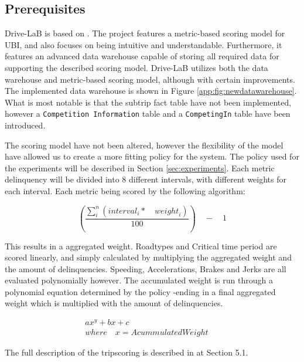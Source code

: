 \subsection{Prerequisites}\label{subsec:prereq}
Drive-LaB is based on \citep{sw9_report}. The project features a metric-based scoring model for UBI, and also focuses on being intuitive and understandable. Furthermore, it features an advanced data warehouse capable of storing all required data for supporting the described scoring model. Drive-LaB utilizes both the data warehouse and metric-based scoring model, although with certain improvements. The implemented data warehouse is shown in Figure \ref{app:fig:newdatawarehouse}. What is most notable is that the subtrip fact table have not been implemented, however a \texttt{Competition Information} table and a \texttt{CompetingIn} table have been introduced.

The scoring model have not been altered, however the flexibility of the model have allowed us to create a more fitting policy for the system. The policy used for the experiments will be described in Section \ref{sec:experiments}. Each metric delinquency will be divided into 8 different intervals, with different weights for each interval. Each metric being scored by the following algorithm:

$$
\left( \frac { \sum _{ i }^{ n }{ \left( { interval }_{ i }*\quad { weight }_{ i } \right)  }  }{ 100 }  \right) \quad -\quad 1
$$

This results in a aggregated weight. Roadtypes and Critical time period are scored linearly, and simply calculated by multiplying the aggregated weight and the amount of delinquencies. Speeding, Accelerations, Brakes and Jerks are all evaluated polynomially however. The accumulated weight is run through a polynomial equation determined by the policy -ending in a final aggregated weight which is multiplied with the amount of delinquencies.

\begin{align*}
ax^{y} + bx + c\quad \quad \quad \quad \quad \quad \quad \quad \quad \quad \quad \\
where\quad x = AcummulatedWeight
\end{align*}

The full description of the tripscoring is described in \citep{sw9_report} at Section 5.1.
